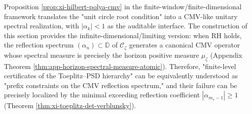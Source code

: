 \begin{remark}\label{rem:xi-verblunsky-cmv-align-finite}
Proposition \ref{prop:xi-hilbert-polya-cmv} in the finite-window/finite-dimensional framework translates the "unit circle root condition" into a CMV-like unitary spectral realization, with \(|\alpha_k|<1\) as the auditable interface.
The construction of this section provides the infinite-dimensional/limiting version: when RH holds, the reflection spectrum \((\alpha_n)\subset\mathbb{D}\) of \(\mathscr{C}_\zeta\) generates a canonical CMV operator whose spectral measure is precisely the horizon positive measure \(\mu_\zeta\) (Appendix Theorem \ref{thm:app-horizon-spectral-measure-atomic}).
Therefore, "finite-level certificates of the Toeplitz--PSD hierarchy" can be equivalently understood as "prefix constraints on the CMV reflection spectrum," and their failure can be precisely localized by the minimal exceeding reflection coefficient \(|\alpha_{m_\star-1}|\ge 1\) (Theorem \ref{thm:xi-toeplitz-det-verblunsky}).
\end{remark}

\endinput
